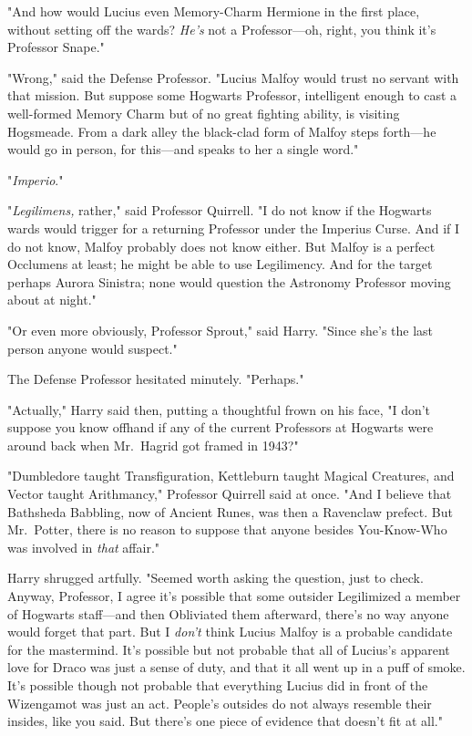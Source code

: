 "And how would Lucius even Memory-Charm Hermione in the first place, without
setting off the wards? \emph{He's} not a Professor—oh, right, you think it's
Professor Snape."

"Wrong," said the Defense Professor. "Lucius Malfoy would trust no servant with
that mission. But suppose some Hogwarts Professor, intelligent enough to cast a
well-formed Memory Charm but of no great fighting ability, is visiting
Hogsmeade. From a dark alley the black-clad form of Malfoy steps forth—he
would go in person, for this—and speaks to her a single word."

"\emph{Imperio}."

"\emph{Legilimens,} rather," said Professor Quirrell. "I do not know if the
Hogwarts wards would trigger for a returning Professor under the Imperius
Curse. And if I do not know, Malfoy probably does not know either. But Malfoy
is a perfect Occlumens at least; he might be able to use Legilimency. And for
the target{\el} perhaps Aurora Sinistra; none would question the Astronomy
Professor moving about at night."

"Or even more obviously, Professor Sprout," said Harry. "Since she's the last
person anyone would suspect."

The Defense Professor hesitated minutely. "Perhaps."

"Actually," Harry said then, putting a thoughtful frown on his face, "I don't
suppose you know offhand if any of the current Professors at Hogwarts were
around back when Mr.~Hagrid got framed in 1943?"

"Dumbledore taught Transfiguration, Kettleburn taught Magical Creatures, and
Vector taught Arithmancy," Professor Quirrell said at once. "And I believe that
Bathsheda Babbling, now of Ancient Runes, was then a Ravenclaw prefect. But
Mr.~Potter, there is no reason to suppose that anyone besides You-Know-Who was
involved in \emph{that} affair."

Harry shrugged artfully. "Seemed worth asking the question, just to check.
Anyway, Professor, I agree it's possible that some outsider Legilimized a
member of Hogwarts staff—and then Obliviated them afterward, there's no way
anyone would forget that part. But I \emph{don't} think Lucius Malfoy is a
probable candidate for the mastermind. It's possible but not probable that all
of Lucius's apparent love for Draco was just a sense of duty, and that it all
went up in a puff of smoke. It's possible though not probable that everything
Lucius did in front of the Wizengamot was just an act. People's outsides do not
always resemble their insides, like you said. But there's one piece of evidence
that doesn't fit at all."

